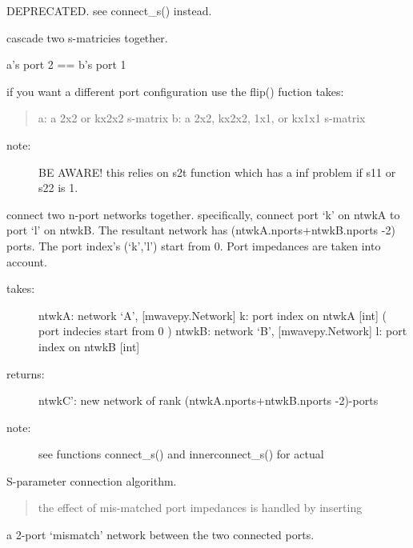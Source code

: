 \documentclass[letterpaper,10pt,english]{sphinxmanual}
\begin{document}
\begin{fulllineitems}
\label{api/mwavepy:mwavepy.network.cascade}
DEPRECATED. see connect\_s() instead.

cascade two s-matricies together.

a's port 2 == b's port 1

if you want a different port configuration use the flip() fuction
takes:
\begin{quote}

a: a 2x2 or kx2x2 s-matrix
b: a 2x2, kx2x2, 1x1, or kx1x1 s-matrix
\end{quote}
\begin{description}
\item[{note:}] \leavevmode
BE AWARE! this relies on s2t function which has a inf problem 
if s11 or s22 is 1.

\end{description}

\end{fulllineitems}


\begin{fulllineitems}
\label{api/mwavepy:mwavepy.network.connect}
connect two n-port networks together. specifically, connect port `k'
on ntwkA to port `l' on ntwkB. The resultant network has
(ntwkA.nports+ntwkB.nports -2) ports. The port index's (`k','l') 
start from 0. Port impedances are taken into account.
\begin{description}
\item[{takes:}] \leavevmode
ntwkA: network `A', {[}mwavepy.Network{]}
k: port index on ntwkA {[}int{]} ( port indecies start from 0 )
ntwkB: network `B', {[}mwavepy.Network{]}
l: port index on ntwkB {[}int{]}

\item[{returns:}] \leavevmode
ntwkC': new network of rank (ntwkA.nports+ntwkB.nports -2)-ports

\item[{note:}] \leavevmode
see functions connect\_s() and innerconnect\_s() for actual

\end{description}

S-parameter connection algorithm.
\begin{quote}

the effect of mis-matched port impedances is handled by inserting
\end{quote}

a 2-port `mismatch' network between the two connected ports.

\end{fulllineitems}
\end{document}
